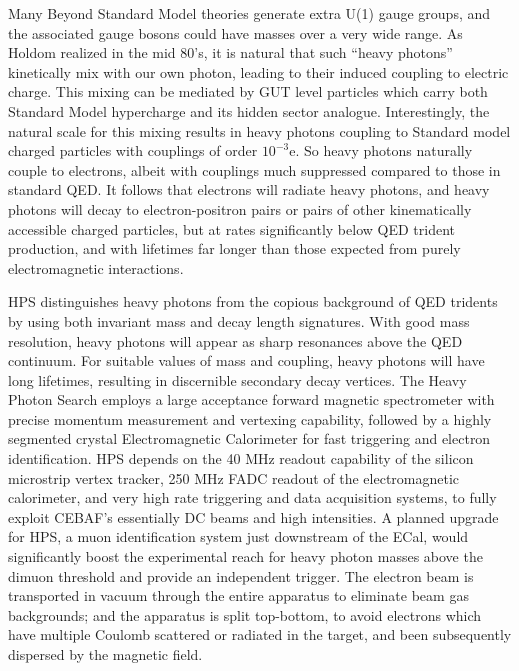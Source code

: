 Many Beyond Standard Model theories generate extra U(1) gauge groups, and the associated gauge bosons could have masses over a very wide range. As Holdom \cite{Holdom:1985ag} realized in the mid 80's, it is natural that such ``heavy photons'' kinetically mix with our own photon, leading to their induced coupling to electric charge. This mixing can be mediated by GUT level particles which carry both Standard Model hypercharge and its hidden sector analogue. Interestingly, the natural scale for this mixing results in heavy photons coupling to Standard model charged particles with couplings of order $10^{-3}$e.  So heavy photons naturally couple to electrons, albeit with couplings much suppressed compared to those in standard QED. It follows that electrons will radiate heavy photons, and heavy photons will decay to electron-positron pairs or pairs of other kinematically accessible charged particles, but at rates significantly below QED trident production, and with lifetimes far longer than those expected from purely electromagnetic interactions.

HPS distinguishes heavy photons from the copious background of QED tridents by  using both invariant mass and decay length signatures. With good mass resolution, heavy photons will appear as sharp resonances above the QED continuum. For suitable values of mass and coupling, heavy photons will have long lifetimes, resulting in discernible secondary decay vertices.  The Heavy Photon Search employs a large acceptance  forward magnetic spectrometer with precise momentum measurement and vertexing  capability, followed by a highly segmented crystal Electromagnetic Calorimeter for fast triggering and electron identification.  HPS depends on  the 40 MHz readout capability of the silicon microstrip vertex tracker, 250 MHz FADC readout of the  electromagnetic calorimeter, and very high rate triggering and data acquisition systems, to fully exploit CEBAF's essentially DC beams and  high intensities. A planned upgrade for HPS, a muon identification system just downstream of the ECal, would significantly boost the experimental reach for heavy photon masses above the dimuon threshold and provide an independent trigger. The electron beam is transported in vacuum through the entire apparatus to eliminate beam gas backgrounds; and the apparatus is split top-bottom, to avoid electrons  which have multiple Coulomb scattered or radiated  in the target, and been subsequently dispersed by the magnetic field.

